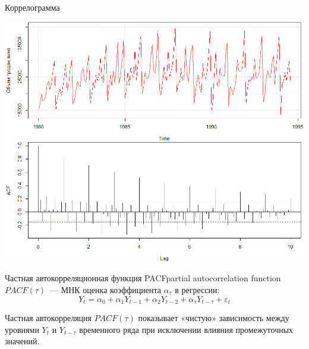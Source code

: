 \documentclass[10pt,pdf,utf8,hyperref={unicode},aspectratio=169]{beamer}
\begin{document}
\begin{frame}{Коррелограмма}{}
	\begin{center}
		\includegraphics[height=0.85\textheight]{wineacf.png}
	\end{center}				
\end{frame}
\begin{frame}{Частная автокорреляционная функция PACF}{partial autocorrelation function}
	$PACF(\tau)$~--- МНК оценка коэффициента $\alpha_\tau$ в регрессии:
 $$
    Y_t = \alpha_0 + \alpha_1 Y_{t-1} +   \alpha_2 Y_{t-2} +  \alpha_\tau Y_{t-\tau} + \varepsilon_t
 $$

Частная автокорреляция $PACF(\tau)$ показывает «чистую» зависимость между уровнями $Y_t$ и $Y_{t-\tau}$ временного ряда при исключении влияния промежуточных значений.
\end{frame}
\end{document}
